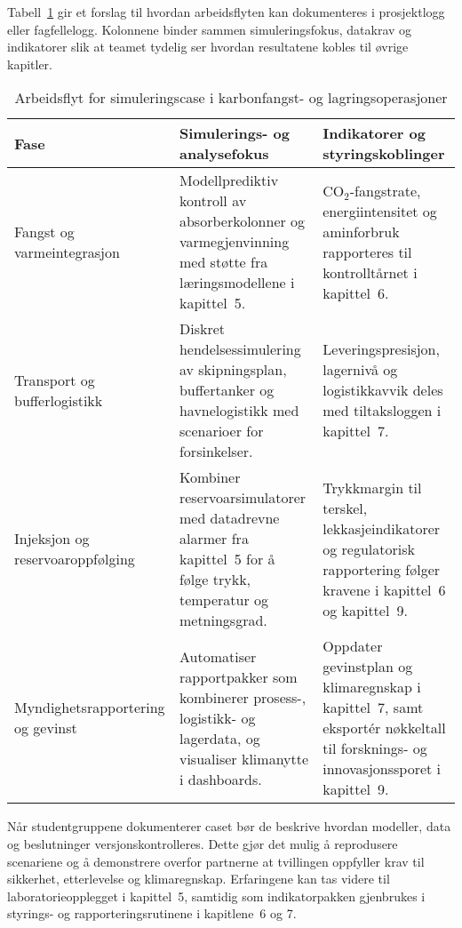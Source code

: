 Tabell~\ref{tab:kap04-ccs-simulering} gir et forslag til hvordan arbeidsflyten kan dokumenteres i prosjektlogg eller fagfellelogg. Kolonnene binder sammen simuleringsfokus, datakrav og indikatorer slik at teamet tydelig ser hvordan resultatene kobles til øvrige kapitler.

\begin{table}[htbp]
    \centering
    \caption{Arbeidsflyt for simuleringscase i karbonfangst- og lagringsoperasjoner}
    \label{tab:kap04-ccs-simulering}
    \begin{tabular}{p{}p{}p{}}
        \toprule
        \textbf{Fase} & \textbf{Simulerings- og analysefokus} & \textbf{Indikatorer og styringskoblinger}\\
        \midrule
        Fangst og varmeintegrasjon & Modellprediktiv kontroll av absorberkolonner og varmegjenvinning med støtte fra læringsmodellene i kapittel~5. & CO$_2$-fangstrate, energiintensitet og aminforbruk rapporteres til kontrolltårnet i kapittel~6.\\
        \addlinespace
        Transport og bufferlogistikk & Diskret hendelsessimulering av skipningsplan, buffertanker og havnelogistikk med scenarioer for forsinkelser. & Leveringspresisjon, lagernivå og logistikkavvik deles med tiltaksloggen i kapittel~7.\\
        \addlinespace
        Injeksjon og reservoaroppfølging & Kombiner reservoarsimulatorer med datadrevne alarmer fra kapittel~5 for å følge trykk, temperatur og metningsgrad. & Trykkmargin til terskel, lekkasjeindikatorer og regulatorisk rapportering følger kravene i kapittel~6 og kapittel~9.\\
        \addlinespace
        Myndighetsrapportering og gevinst & Automatiser rapportpakker som kombinerer prosess-, logistikk- og lagerdata, og visualiser klimanytte i dashboards. & Oppdater gevinstplan og klimaregnskap i kapittel~7, samt eksportér nøkkeltall til forsknings- og innovasjonssporet i kapittel~9.\\
        \bottomrule
    \end{tabular}
\end{table}

Når studentgruppene dokumenterer caset bør de beskrive hvordan modeller, data og beslutninger versjonskontrolleres. Dette gjør det mulig å reprodusere scenariene og å demonstrere overfor partnerne at tvillingen oppfyller krav til sikkerhet, etterlevelse og klimaregnskap. Erfaringene kan tas videre til laboratorieopplegget i kapittel~5, samtidig som indikatorpakken gjenbrukes i styrings- og rapporteringsrutinene i kapitlene~6 og 7.

